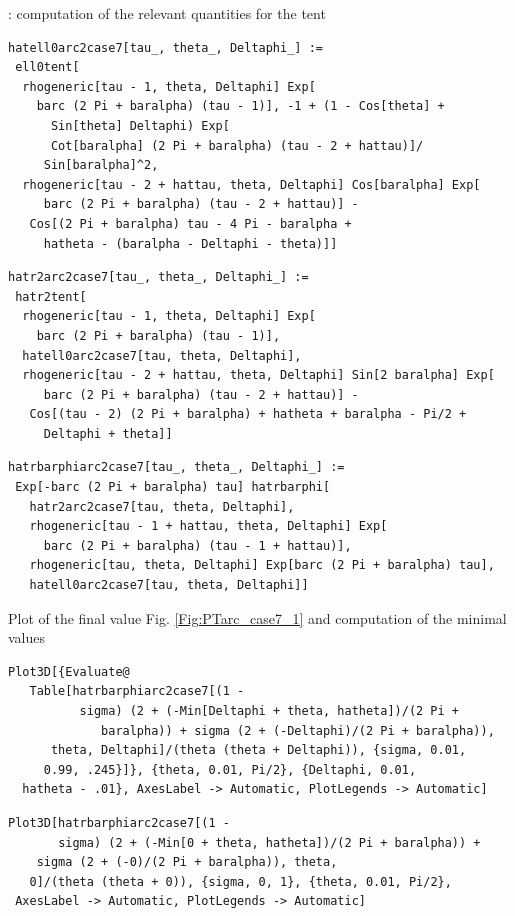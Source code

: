 \documentclass[reqno]{amsart}
\theoremstyle{definition} \newtheorem{definition}{Definition}[section]
\theoremstyle{definition} \newtheorem{remark}[definition]{Remark}
\theoremstyle{plain} \newtheorem{lemma}[definition]{Lemma}
\theoremstyle{plain} \newtheorem{proposition}[definition]{Proposition}
\theoremstyle{plain} \newtheorem{theorem}[definition]{Theorem}
\theoremstyle{plain} \newtheorem{corollary}[definition]{Corollary}
\theoremstyle{definition} \newtheorem{example}[definition]{Example}
\theoremstyle{plain} \newtheorem{claim}[clai]{Claim}
\theoremstyle{definition} \newtheorem{assumption}[definition]{Assumption}
\theoremstyle{definition} \newtheorem{observation}[definition]{Observation}
\newcommand{\1}{\mathbbm 1}
\newcommand{\smed}{\medskip}
\numberwithin{equation}{section} %
\theoremstyle{plain} \newtheorem*{theorem*}{Theorem}
\theoremstyle{plain} \newtheorem{mthm}[maintheorem]{Main Theorem}
\theoremstyle{plain} \newtheorem*{mthm*}{Main Theorem}
\theoremstyle{plain} \newtheorem*{conjecture*}{Conjecture}
\theoremstyle{plain} \newtheorem{conjecture}[definition]{Conjecture}
\theoremstyle{plain} \newtheorem*{problem*}{Problem}
\begin{document}
: computation of the relevant quantities for the tent
\smed
\begin{verbatim}
hatell0arc2case7[tau_, theta_, Deltaphi_] := 
 ell0tent[
  rhogeneric[tau - 1, theta, Deltaphi] Exp[
    barc (2 Pi + baralpha) (tau - 1)], -1 + (1 - Cos[theta] + 
      Sin[theta] Deltaphi) Exp[
      Cot[baralpha] (2 Pi + baralpha) (tau - 2 + hattau)]/
     Sin[baralpha]^2, 
  rhogeneric[tau - 2 + hattau, theta, Deltaphi] Cos[baralpha] Exp[
     barc (2 Pi + baralpha) (tau - 2 + hattau)] - 
   Cos[(2 Pi + baralpha) tau - 4 Pi - baralpha + 
     hatheta - (baralpha - Deltaphi - theta)]]
\end{verbatim}
\begin{verbatim}
hatr2arc2case7[tau_, theta_, Deltaphi_] := 
 hatr2tent[
  rhogeneric[tau - 1, theta, Deltaphi] Exp[
    barc (2 Pi + baralpha) (tau - 1)], 
  hatell0arc2case7[tau, theta, Deltaphi], 
  rhogeneric[tau - 2 + hattau, theta, Deltaphi] Sin[2 baralpha] Exp[
     barc (2 Pi + baralpha) (tau - 2 + hattau)] - 
   Cos[(tau - 2) (2 Pi + baralpha) + hatheta + baralpha - Pi/2 + 
     Deltaphi + theta]]
\end{verbatim}
\begin{verbatim}
hatrbarphiarc2case7[tau_, theta_, Deltaphi_] := 
 Exp[-barc (2 Pi + baralpha) tau] hatrbarphi[
   hatr2arc2case7[tau, theta, Deltaphi], 
   rhogeneric[tau - 1 + hattau, theta, Deltaphi] Exp[
     barc (2 Pi + baralpha) (tau - 1 + hattau)], 
   rhogeneric[tau, theta, Deltaphi] Exp[barc (2 Pi + baralpha) tau], 
   hatell0arc2case7[tau, theta, Deltaphi]]
\end{verbatim}
\smed
Plot of the final value Fig. \ref{Fig:PTarc_case7_1} and computation of the minimal values
\smed
\begin{verbatim}
Plot3D[{Evaluate@
   Table[hatrbarphiarc2case7[(1 - 
          sigma) (2 + (-Min[Deltaphi + theta, hatheta])/(2 Pi + 
             baralpha)) + sigma (2 + (-Deltaphi)/(2 Pi + baralpha)), 
      theta, Deltaphi]/(theta (theta + Deltaphi)), {sigma, 0.01, 
     0.99, .245}]}, {theta, 0.01, Pi/2}, {Deltaphi, 0.01, 
  hatheta - .01}, AxesLabel -> Automatic, PlotLegends -> Automatic]
\end{verbatim}
\begin{verbatim}
Plot3D[hatrbarphiarc2case7[(1 - 
       sigma) (2 + (-Min[0 + theta, hatheta])/(2 Pi + baralpha)) + 
    sigma (2 + (-0)/(2 Pi + baralpha)), theta, 
   0]/(theta (theta + 0)), {sigma, 0, 1}, {theta, 0.01, Pi/2}, 
 AxesLabel -> Automatic, PlotLegends -> Automatic]
\end{verbatim}
\end{document}
